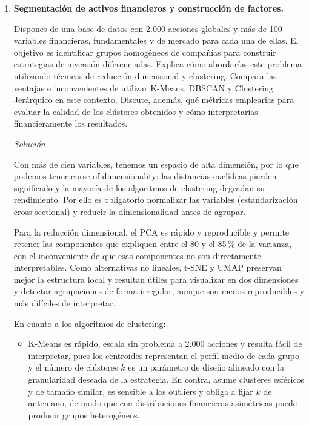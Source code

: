\documentclass[12pt]{article}
\newcommand\sol[1]{\begin{mdframed}
\emph{Solución.} #1
\end{mdframed}}
\begin{document}
\begin{enumerate}
{\medskip
El riesgo específico del equipo~A es que, aun con métricas excelentes, podría estar aprendiendo a
identificar patrones posteriores al hecho (clientes que ya abandonaron) en lugar de señales
predictivas tempranas; la variable ``días sin actividad'' puede actuar como un sustituto del propio
objetivo, lo que inflaría artificialmente el rendimiento sin aportar valor predictivo real.
}

\item \textbf{Segmentación de activos financieros y construcción de factores.}

Dispones de una base de datos con 2.000 acciones globales y más de 100 variables financieras,
fundamentales y de mercado para cada una de ellas. El objetivo es identificar grupos homogéneos de
compañías para construir estrategias de inversión diferenciadas. Explica cómo abordarías este
problema utilizando técnicas de reducción dimensional y clustering. Compara las ventajas e
inconvenientes de utilizar K-Means, DBSCAN y Clustering Jerárquico en este contexto. Discute,
además, qué métricas emplearías para evaluar la calidad de los clústeres obtenidos y cómo
interpretarías financieramente los resultados.

\sol{

Con más de cien variables, tenemos un espacio de alta dimensión, por lo que podemos tener curse of dimensionality:
las distancias euclídeas pierden significado y la mayoría de los algoritmos de clustering degradan su
rendimiento. Por ello es obligatorio normalizar las variables (estandarización cross-sectional) y
reducir la dimensionalidad antes de agrupar.

\medskip
Para la reducción dimensional, el PCA es rápido y reproducible y permite retener las componentes que
expliquen entre el 80 y el 85\,\% de la varianza, con el inconveniente de que esas componentes no son
directamente interpretables. Como alternativas no lineales, t-SNE y UMAP preservan mejor la
estructura local y resultan útiles para visualizar en dos dimensiones y detectar agrupaciones de
forma irregular, aunque son menos reproducibles y más difíciles de interpretar.

\medskip
En cuanto a los algoritmos de clustering:

\begin{itemize}
  \item K-Means es rápido, escala sin problema a 2.000 acciones y resulta fácil de interpretar, pues
  los centroides representan el perfil medio de cada grupo y el número de clústeres $k$ es un parámetro
  de diseño alineado con la granularidad deseada de la estrategia. En contra, asume clústeres
  esféricos y de tamaño similar, es sensible a los outliers y obliga a fijar $k$ de antemano, de modo
  que con distribuciones financieras asimétricas puede producir grupos heterogéneos.


\end{itemize}}
\end{enumerate}
\end{document}
